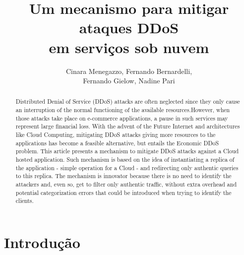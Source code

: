 \documentclass[a4paper, 12pt]{article}
\begin{document}
\title{Um mecanismo para mitigar ataques DDoS \\em serviços sob nuvem}


\author{
Cinara Menegazzo, Fernando Bernardelli, \\
Fernando Gielow, Nadine Pari
}
   
\address{Departamento de Informática -- Universidade Federal do Paraná\\
NR2 - Núcleo de Redes Sem Fio e Redes Avançadas\\
  Caixa Postal 19.081 -- 81.531-980 -- Curitiba -- PR -- Brasil
}     

\maketitle

\begin{abstract}
Distributed Denial of Service (DDoS) attacks are often neglected since they only cause an interruption of the normal functioning of the available resources.However, when those attacks take place on e-commerce applications, a pause in such services may represent large financial loss. With the advent of the Future Internet and architectures like Cloud Computing, mitigating DDoS attacks giving more resources to the applications has become a feasible alternative, but entails the Economic DDoS problem. This article presents a mechanism to mitigate DDoS attacks against a Cloud hosted application. Such mechanism is based on the idea of instantiating a replica of the application - simple operation for a Cloud - and redirecting only authentic queries to this replica. The mechanism is innovator because there is no need to identify the attackers and, even so, get to filter only authentic traffic, without extra overhead and potential categorization errors that could be introduced when trying to identify the clients.
%
\end{abstract}

\begin{resumo}

\end{resumo}

\section{Introdução}

\end{document}
